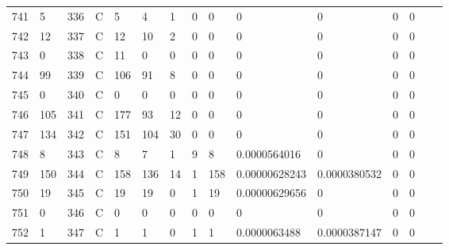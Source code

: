 \begin{longtable}{lllllllllllllll}
	741 & 5                 & 336 & C   & 5                 & 4                 & 1                 & 0    & 0          & 0              & 0              & 0             & 0            \\
	742 & 12                & 337 & C   & 12                & 10                & 2                 & 0    & 0          & 0              & 0              & 0             & 0            \\
	743 & 0                 & 338 & C   & 11                & 0                 & 0                 & 0    & 0          & 0              & 0              & 0             & 0            \\
	744 & 99                & 339 & C   & 106               & 91                & 8                 & 0    & 0          & 0              & 0              & 0             & 0            \\
	745 & 0                 & 340 & C   & 0                 & 0                 & 0                 & 0    & 0          & 0              & 0              & 0             & 0            \\
	746 & 105               & 341 & C   & 177               & 93                & 12                & 0    & 0          & 0              & 0              & 0             & 0            \\
	747 & 134               & 342 & C   & 151               & 104               & 30                & 0    & 0          & 0              & 0              & 0             & 0            \\
	748 & 8                 & 343 & C   & 8                 & 7                 & 1                 & 9    & 8          & 0.0000564016   & 0              & 0             & 0            \\
	749 & 150               & 344 & C   & 158               & 136               & 14                & 1    & 158        & 0.00000628243  & 0.0000380532   & 0             & 0            \\
	750 & 19                & 345 & C   & 19                & 19                & 0                 & 1    & 19         & 0.00000629656  & 0              & 0             & 0            \\
	751 & 0                 & 346 & C   & 0                 & 0                 & 0                 & 0    & 0          & 0              & 0              & 0             & 0            \\
	752 & 1                 & 347 & C   & 1                 & 1                 & 0                 & 1    & 1          & 0.0000063488   & 0.0000387147   & 0             & 0            \\

\end{longtable}
